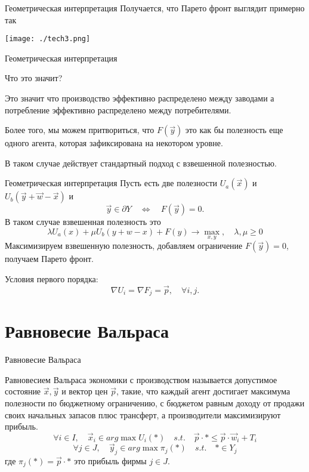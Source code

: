 \documentclass{beamer}
\begin{document}
\begin{frame}{Геометрическая интерпретация}
Получается, что Парето фронт выглядит примерно так
\begin{center}
     \texttt{[image: ./tech3.png]}
     \end{center}

\end{frame}

\begin{frame}{Геометрическая интерпретация}

Что это значит? 

Это значит что производство эффективно распределено между заводами а потребление эффективно распределено между потребителями. 

Более того, мы можем притвориться, что $F(\vec y)$ это как бы полезность еще одного агента, которая зафиксирована на некотором уровне. 

В таком случае действует стандартный подход с взвешенной полезностью.

\end{frame}

\begin{frame}{Геометрическая интерпретация}
Пусть есть две полезности $U_a(\vec x)$ и $U_b(\vec y + \vec w - \vec x)$ и
$$\vec y \in \partial Y \quad \Leftrightarrow \quad F(\vec y) = 0.$$
В таком случае взвешенная полезность это
$$ \lambda U_a(x) + \mu U_b(y + w-x) + F(y) \to \max_{x,y}, \quad \lambda, \mu \geqslant 0$$
Максимизируем взвешенную полезность, добавляем ограничение $F(\vec y) = 0$, получаем Парето фронт.

Условия первого порядка:
$$ \nabla U_i = \nabla F_j = \vec p, \quad \forall i,j.$$ 

\end{frame}

\section{Равновесие Вальраса}

\begin{frame}{Равновесие Вальраса}

\alert{Равновесием Вальраса} экономики с производством называется допустимое состояние $\vec x, \vec y$ и вектор цен $\vec p$, такие, что каждый агент достигает максимума полезности по бюджетному ограничению, с бюджетом равным доходу от продажи своих начальных запасов плюс трансферт, а производители максимизируют прибыль.
$$ \forall i \in I, \quad \vec x_i \in arg \max U_i(*) \quad s.t. \quad \vec p \cdot * \leqslant \vec p \cdot \vec w_i + T_i$$
$$ \forall j \in J, \quad \vec y_j \in arg \max \pi_j(*) \quad s.t. \quad * \in Y_j$$
где $\pi_j(*) = \vec p \cdot *$ это прибыль фирмы $j \in J$. 

\end{frame}
\end{document}
